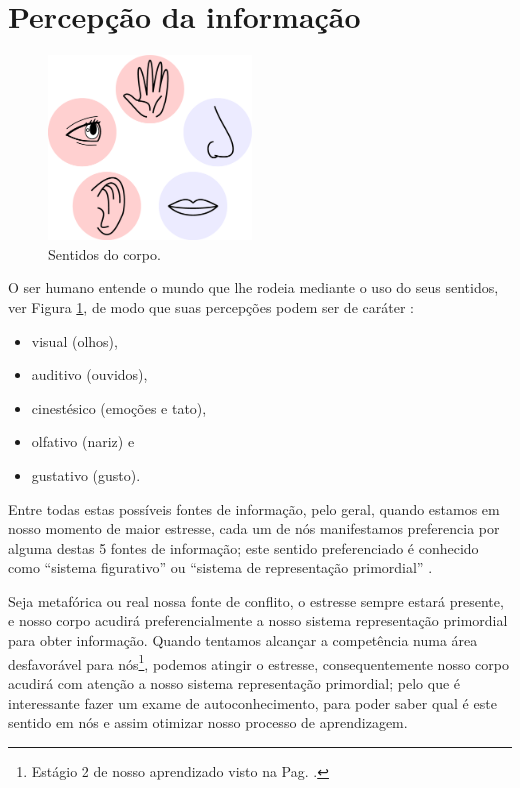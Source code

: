 
\section{Percepção da informação}
\label{sec:percepcionaprendizagem}

\begin{figure}
  \centering
    \includegraphics[width=0.48\textwidth]{chapters/cap-learning/sentidos.eps} 
  \caption{Sentidos do corpo.}
\label{fig:5sentidos}
\end{figure}
O ser humano entende o mundo que lhe rodeia mediante o uso do seus sentidos,
ver Figura \ref{fig:5sentidos},
de modo que suas percepções podem ser de caráter \cite[pp. 28]{ready2010pnl}:
\begin{itemize}
\item visual (olhos), 
\item auditivo (ouvidos),
\item cinestésico (emoções e tato), 
\item olfativo (nariz) e
\item gustativo (gusto).
\end{itemize}

Entre todas estas possíveis fontes de informação,
pelo geral, quando estamos em nosso momento de maior estresse,
cada um de nós manifestamos preferencia por alguma destas 5 fontes de informação;
este sentido preferenciado é conhecido como ``sistema figurativo'' ou ``sistema de representação primordial''
\cite[pp. 28]{ready2010pnl}.


Seja metafórica ou real nossa fonte de conflito, o estresse sempre estará presente,
e nosso corpo acudirá preferencialmente a nosso sistema representação primordial para obter informação.
Quando tentamos alcançar a competência numa área desfavorável para nós\footnote{Estágio 
2 de nosso aprendizado visto na Pag. \pageref{ref:IncompetenciaConsciente}.},
podemos atingir o estresse, consequentemente nosso corpo acudirá com atenção a 
nosso sistema representação primordial;
pelo que é interessante fazer um exame de autoconhecimento, 
para poder saber qual é este sentido em nós e assim otimizar nosso processo de aprendizagem.

